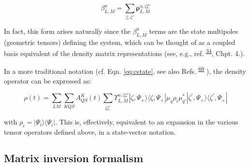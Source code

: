 \documentclass[10pt]{article}
\begin{document}
\begin{equation}
\beta_{L,M}^{u}=\sum_{\zeta,\zeta'}\mathbf{\rho}_{L,M}^{u,\zeta\zeta'}
\end{equation}

In fact, this form arises naturally since the $\beta_{L,M}^{u}$ terms are the state multipoles (geometric tensors) defining the system, which can be thought of as a coupled basis equivalent of the density matrix representations (see, e.g., ref. \textsuperscript{\hyperref[csl:34]{34}}, Chpt. 4.).

In a more traditional notation (cf. Eqn. \ref{eq:cstate}, see also Refs. \textsuperscript{\hyperref[csl:69]{69}} 
), the density operator can be expressed as:



\begin{equation}
\rho(t) =\sum_{LM}\sum_{KQS}A^{K}_{QS}(t)\sum_{\zeta\zeta^{\prime}}\varUpsilon_{L,M}^{u,\zeta\zeta'}|\zeta,\Psi_+\rangle\langle\zeta,\Psi_+|\mu_q\rho_i\mu_{q\prime}^{*}|\zeta^{\prime},\Psi_+\rangle\langle\zeta^{\prime},\Psi_+|
\end{equation}


with $\rho_i = |\Psi_i\rangle\langle\Psi_i|$. This is, effectively, equivalent to an expansion in the various tensor operators defined above, in a state-vector notation.




\subsection{Matrix inversion formalism\label{app:mat-inversion}}
\end{document}
